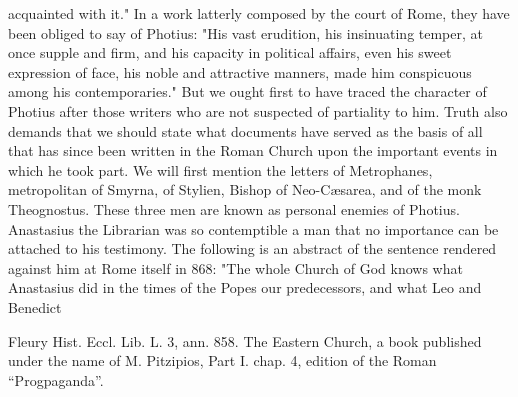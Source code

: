 acquainted with it." In a work latterly composed by the court of Rome, they have been obliged to say of Photius: "His vast erudition, his insinuating temper, at once supple and firm, and his capacity in political affairs, even his sweet expression of face, his noble and attractive manners, made him conspicuous among his contemporaries." But we ought first to have traced the character of Photius after those writers who are not suspected of partiality to him. Truth also demands that we should state what documents have served as the basis of all that has since been written in the Roman Church upon the important events in which he took part. We will first mention the letters of Metrophanes, metropolitan of Smyrna, of Stylien, Bishop of Neo-Cæsarea, and of the monk Theognostus. These three men are known as personal enemies of Photius. Anastasius the Librarian was so contemptible a man that no importance can be attached to his testimony. The following is an abstract of the sentence rendered against him at Rome itself in 868: "The whole Church of God knows what Anastasius did in the times of the Popes our predecessors, and what Leo and Benedict

Fleury Hist. Eccl. Lib. L. 3, ann. 858. The Eastern Church, a book published under the name of M. Pitzipios, Part I. chap. 4, edition of the Roman “Progpaganda”.

